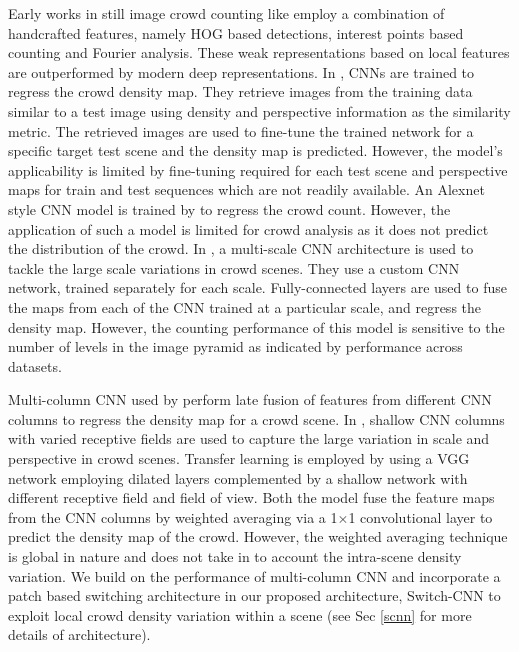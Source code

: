 \documentclass[10pt,twocolumn,letterpaper]{article}
\begin{document}
Early works in still image crowd counting like \cite{idrees2013multi} employ a combination of handcrafted features, namely HOG based detections, interest points based counting and Fourier analysis. These weak representations based on local features are outperformed by modern deep representations.
In \cite{zhang2015cross}, CNNs are trained to regress the crowd density map. They retrieve images from the training data similar to a test image using density and perspective information as the similarity metric. The retrieved images are used to fine-tune the trained network for a specific target test scene and the density map is predicted. However, the model's applicability is limited by fine-tuning required for each test scene and  perspective maps for train and test sequences which are not readily available. An Alexnet~\cite{krizhevsky2012imagenet} style CNN model is trained by \cite{wang2015deep} to regress the crowd count. However, the application of such a model is limited for crowd analysis as it does not predict the distribution of the crowd.   
In \cite{onoro2016towards}, a multi-scale CNN architecture is used to tackle the large scale variations in crowd scenes. They use a custom CNN network, trained separately for each scale. Fully-connected layers are used to fuse the maps from each of the CNN trained at a particular scale, and regress the density map. However, the counting performance of this model is sensitive to the number of levels in the image pyramid as indicated by performance across datasets.

Multi-column CNN used by \cite{boominathan2016crowdnet,zhang2016single} perform late fusion of features from different CNN columns to regress the density map for a crowd scene. In \cite{zhang2016single}, shallow CNN columns with varied receptive fields are used to capture the large variation in scale and perspective in crowd scenes. Transfer learning is employed by \cite{boominathan2016crowdnet} using a VGG network employing dilated layers complemented by a shallow network with different receptive field and field of view. Both the model fuse the feature maps from the CNN columns by weighted averaging via a 1$\times$1 convolutional layer to predict the density map of the crowd. However, the weighted averaging technique is global in nature and does not take in to account the intra-scene density variation. We build on the performance of multi-column CNN and incorporate a patch based switching architecture in our proposed architecture, Switch-CNN to exploit local crowd density  variation within a scene (see Sec \ref{scnn} for more details of architecture). 
\end{document}
